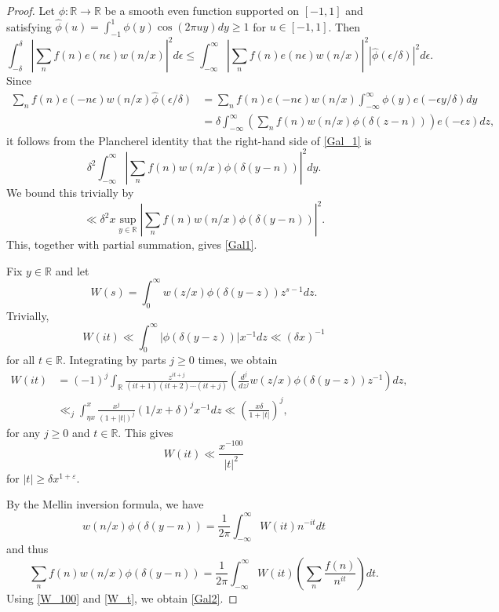 \documentclass{amsart}
\theoremstyle{definition}
\theoremstyle{remark}
\newcommand{\1}{
    \bm{1}
}
\begin{document}
\begin{proof}


Let $\phi:\mathbb{R} \to \mathbb{R}$ be a smooth even function supported on $[-1,1]$ and satisfying $\hat{\phi}(u) = \int_{-1}^{1} \phi(y) \cos(2\pi uy) dy \geq 1$ for $u \in [-1,1]$. Then 
\begin{equation}
\int_{-\delta}^{\delta} \left|\sum_{n} f(n) e(n\epsilon) w(n/x)\right|^2 d\epsilon \leq \int_{-\infty}^{\infty} \left|\sum_{n} f(n) e(n\epsilon) w(n/x)\right|^2 |\hat{\phi}(\epsilon/\delta)|^2 d\epsilon. \label{Gal_1}
\end{equation}
Since
\begin{align*}
\sum_{n} f(n) e(-n\epsilon) w(n/x) \hat{\phi}(\epsilon/\delta) &= \sum_{n} f(n) e(-n\epsilon) w(n/x) \int_{-\infty}^{\infty} \phi(y) e(-\epsilon y/\delta) dy \\
&= \delta \int_{-\infty}^{\infty} \left( \sum_{n} f(n) w(n/x) \phi(\delta(z-n)) \right) e(-\epsilon z) dz,
\end{align*}
it follows from the Plancherel identity that the right-hand side of \eqref{Gal_1} is
\[ \delta^2 \int_{-\infty}^{\infty} \left| \sum_{n} f(n) w(n/x) \phi(\delta(y-n)) \right|^2 dy. \]
We bound this trivially by
\[ \ll \delta^2 x \sup_{y \in \mathbb{R}} \left| \sum_{n} f(n) w(n/x) \phi(\delta(y-n)) \right|^2. \]
This, together with partial summation, gives \eqref{Gal1}. 



Fix $y \in \mathbb{R}$ and let
\[ W(s) = \int_{0}^{\infty} w(z/x) \phi(\delta(y-z)) z^{s-1} dz. \]
Trivially, 
\begin{equation} W(it) \ll \int_{0}^{\infty} |\phi(\delta(y-z))| x^{-1} dz \ll (\delta x)^{-1} \label{W_t} \end{equation}
for all $t \in \mathbb{R}$. 
Integrating by parts $j\geq 0$ times, we obtain 
\begin{align*}
W(it) &= (-1)^j \int_{\mathbb{R}} \frac{z^{it+j}}{(it+1)(it+2)\cdots (it+j)} \left( \frac{d^j}{dz^j} w(z/x) \phi(\delta(y-z)) z^{-1} \right) dz, \\
&\ll_j \int_{\eta x}^{x} \frac{x^j}{(1+|t|)^j} (1/x+\delta)^j x^{-1} dz \ll \left( \frac{x\delta}{1+|t|} \right)^j,
\end{align*}
for any $j\geq 0$ and $t \in \mathbb{R}$. 
This gives
\begin{equation} W(it) \ll \frac{x^{-100}}{|t|^2} \label{W_100} \end{equation}
for $|t| \geq \delta x^{1+\varepsilon}$. 

By the Mellin inversion formula, we have
\[ w(n/x) \phi(\delta(y-n)) = \frac{1}{2\pi} \int_{-\infty}^{\infty} W(it) n^{-it} dt \]
and thus
\[ \sum_{n} f(n) w(n/x) \phi(\delta(y-n)) = \frac{1}{2\pi} \int_{-\infty}^{\infty} W(it) \left( \sum_{n} \frac{f(n)}{n^{it}} \right) dt. \]
Using \eqref{W_100} and \eqref{W_t}, we obtain \eqref{Gal2}. 


\end{proof}
\end{document}
